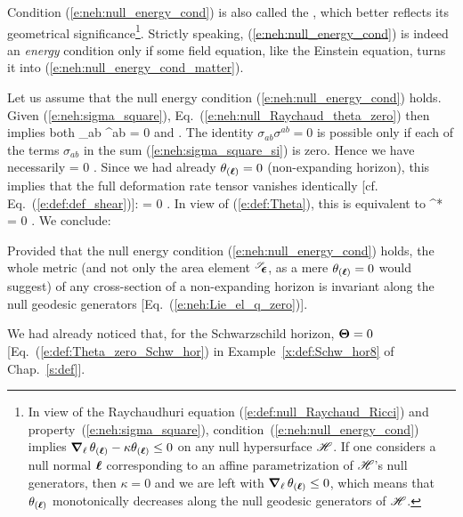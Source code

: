 \begin{remark}
Condition (\ref{e:neh:null_energy_cond}) is also called
the  \cite{HawkiE73,Senov22,SenovG15}, which better reflects its geometrical
significance\footnote{In view of the Raychaudhuri equation (\ref{e:def:null_Raychaud_Ricci})
and property~(\ref{e:neh:sigma_square}),
condition~(\ref{e:neh:null_energy_cond}) implies
$\bm{\nabla}_{\ell}\,  \theta_{(\bm{\ell})} -  \kappa \theta_{(\bm{\ell})}\leq 0$ on any null hypersurface
$\mathscr{H}$. If one considers
a null normal $\bm{\ell}$ corresponding to an affine parametrization of $\mathscr{H}$'s null generators,
then $\kappa=0$ and we are left with $\bm{\nabla}_{\ell}\,  \theta_{(\bm{\ell})} \leq 0$, which means
that $\theta_{(\bm{\ell})}$ monotonically decreases along the null geodesic generators of $\mathscr{H}$.}.
Strictly speaking, (\ref{e:neh:null_energy_cond})
is indeed an \emph{energy} condition only if some field equation, like the Einstein equation,
turns it into (\ref{e:neh:null_energy_cond_matter}).
\end{remark}

Let us assume that the null energy condition (\ref{e:neh:null_energy_cond})
holds. Given (\ref{e:neh:sigma_square}),
Eq.~(\ref{e:neh:null_Raychaud_theta_zero}) then implies both
\be
    \sigma_{ab} \sigma^{ab}  = 0
\ee
and
\be \label{e:neh:R_l_l_zero}
    .
\ee
The identity $\sigma_{ab} \sigma^{ab} = 0$ is possible only if each of
the terms $\sigma_{ab}$ in the sum (\ref{e:neh:sigma_square_si}) is zero. Hence we have necessarily
\be
    \w{\sigma} = 0 .
\ee
Since we had already $\theta_{(\bm{\ell})}=0$ (non-expanding horizon), this implies that the full deformation rate tensor
vanishes identically [cf. Eq.~(\ref{e:def:def_shear})]:
\be
    \w{\Theta} = 0 .
\ee
In view of (\ref{e:def:Theta}), this is equivalent to
\be \label{e:neh:Lie_el_q_zero}
     ^* \Lie{\el}  = 0 .
\ee
We conclude:
\begin{prop}
\label{p:neh:invariance_of_2metric}
Provided that the null energy condition (\ref{e:neh:null_energy_cond})
holds,
the whole metric (and not only the area element
${}^{\mathscr{S}}\!\!\bm{\epsilon}$, as a mere $\theta_{(\bm{\ell})}=0$ would suggest) of any cross-section
of a non-expanding horizon is invariant along the null geodesic generators
[Eq.~(\ref{e:neh:Lie_el_q_zero})].
\end{prop}

\begin{example}
We had already noticed that, for the Schwarzschild horizon, $\bm{\Theta}=0$
[Eq.~(\ref{e:def:Theta_zero_Schw_hor}) in Example~\ref{x:def:Schw_hor8}
of Chap.~\ref{s:def}].
\end{example}

